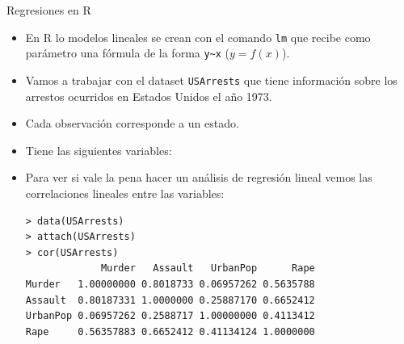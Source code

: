 \documentclass[handout]{beamer}
\begin{document}
\begin{frame}[fragile]{Regresiones en R}
\scriptsize{
\begin{itemize}
 \item En R lo modelos lineales se crean con el comando \verb+lm+ que recibe como parámetro una fórmula de la forma \verb+y~x+ ($y=f(x)$).
 \item Vamos a trabajar con el dataset \verb+USArrests+ que tiene información sobre los arrestos ocurridos en Estados Unidos el año 1973. 
 \item Cada observación corresponde a un estado.
 \item Tiene las siguientes variables:
 
\item Para ver si vale la pena hacer un análisis de regresión lineal vemos las correlaciones lineales entre las variables: 

 \begin{verbatim}
> data(USArrests)
> attach(USArrests)
> cor(USArrests)
             Murder   Assault   UrbanPop      Rape
Murder   1.00000000 0.8018733 0.06957262 0.5635788
Assault  0.80187331 1.0000000 0.25887170 0.6652412
UrbanPop 0.06957262 0.2588717 1.00000000 0.4113412
Rape     0.56357883 0.6652412 0.41134124 1.0000000  
 \end{verbatim}

 
 
 
\end{itemize}
 
 
 
 
} 
\end{frame}
\end{document}
